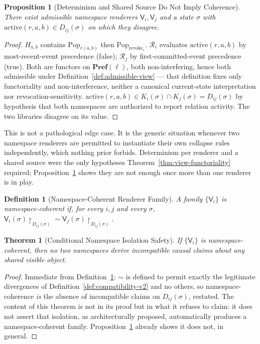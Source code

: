 \documentclass[11pt]{article}
\newtheorem{definition}{Definition}[section]
\newtheorem{proposition}{Proposition}[section]
\newtheorem{theorem}{Theorem}[section]
\begin{document}
\begin{proposition}[Determinism and Shared Source Do Not Imply Coherence]
\label{prop:determinism-insufficient-v2}
There exist admissible namespace renderers $\mathsf{V}_i, \mathsf{V}_j$ and a state $\sigma$ with $\mathrm{active}(r,a,b) \in D_{ij}(\sigma)$ on which they disagree.
\end{proposition}
\begin{proof}
$H_{a,b}$ contains $\mathrm{Pop}_{r(a,b)}$ then $\mathrm{Pop}_{\mathrm{revoke}_r}$. $\mathcal{R}_i$ evaluates $\mathrm{active}(r,a,b)$ by most-recent-event precedence (false); $\mathcal{R}_j$ by first-committed-event precedence (true). Both are functors on $\mathbf{Pref}(\ell)$, both non-interfering, hence both admissible under Definition~\ref{def:admissible-view} --- that definition fixes only functoriality and non-interference, neither a canonical current-state interpretation nor revocation-sensitivity. $\mathrm{active}(r,a,b) \in K_i(\sigma) \cap K_j(\sigma) = D_{ij}(\sigma)$ by hypothesis that both namespaces are authorized to report relation activity. The two libraries disagree on its value.
\end{proof}

This is not a pathological edge case. It is the generic situation whenever two namespace renderers are permitted to instantiate their own collapse rules independently, which nothing prior forbids. Determinism per renderer and a shared source were the only hypotheses Theorem~\ref{thm:view-functoriality} required; Proposition~\ref{prop:determinism-insufficient-v2} shows they are not enough once more than one renderer is in play.

\begin{definition}[Namespace-Coherent Renderer Family]
\label{def:namespace-coherent-family}
A family $\{\mathsf{V}_i\}$ is namespace-coherent if, for every $i,j$ and every $\sigma$, $\mathsf{V}_i(\sigma)\!\restriction_{D_{ij}(\sigma)} \sim \mathsf{V}_j(\sigma)\!\restriction_{D_{ij}(\sigma)}$.
\end{definition}

\begin{theorem}[Conditional Namespace Isolation Safety]
\label{thm:conditional-isolation}
If $\{\mathsf{V}_i\}$ is namespace-coherent, then no two namespaces derive incompatible causal claims about any shared visible object.
\end{theorem}
\begin{proof}
Immediate from Definition~\ref{def:namespace-coherent-family}: $\sim$ is defined to permit exactly the legitimate divergences of Definition~\ref{def:compatibility-v2} and no others, so namespace-coherence \emph{is} the absence of incompatible claims on $D_{ij}(\sigma)$, restated. The content of this theorem is not in its proof but in what it refuses to claim: it does not assert that isolation, as architecturally proposed, automatically produces a namespace-coherent family. Proposition~\ref{prop:determinism-insufficient-v2} already shows it does not, in general.
\end{proof}
\end{document}

